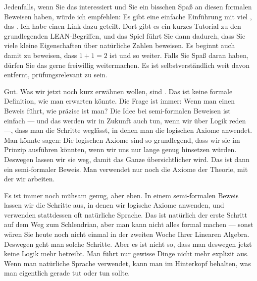\begin{spoken-clean}[00:17:30 - 00:20:50]
Jedenfalls, wenn Sie das interessiert und Sie ein bisschen Spaß an diesen formalen Beweisen haben, würde ich empfehlen: Es gibt eine einfache Einführung mit viel , das . Ich habe einen Link dazu geteilt. Dort gibt es ein kurzes Tutorial zu den grundlegenden LEAN-Begriffen, und das Spiel führt Sie dann dadurch, dass Sie viele kleine Eigenschaften über natürliche Zahlen beweisen. Es beginnt auch damit zu beweisen, dass $1 + 1 = 2$ ist und so weiter. Falls Sie Spaß daran haben, dürfen Sie das gerne freiwillig weitermachen. Es ist selbstverständlich weit davon entfernt, prüfungsrelevant zu sein.

Gut. Was wir jetzt noch kurz erwähnen wollen, sind . Das ist keine formale Definition, wie man erwarten könnte. Die Frage ist immer: Wenn man einen Beweis führt, wie präzise ist man? Die Idee bei semi-formalen Beweisen ist einfach --- und das werden wir in Zukunft auch tun, wenn wir über Logik reden ---, dass man die Schritte weglässt, in denen man die logischen Axiome anwendet. Man könnte sagen: Die logischen Axiome sind so grundlegend, dass wir sie im Prinzip ausführen könnten, wenn wir uns nur lange genug hinsetzen würden. Deswegen lassen wir sie weg, damit das Ganze übersichtlicher wird. Das ist dann ein semi-formaler Beweis. Man verwendet nur noch die Axiome der Theorie, mit der wir arbeiten.

Es ist immer noch mühsam genug, aber eben. In einem semi-formalen Beweis lassen wir die Schritte aus, in denen wir logische Axiome anwenden, und verwenden stattdessen oft natürliche Sprache. Das ist natürlich der erste Schritt auf dem Weg zum Schlendrian, aber man kann nicht alles formal machen --- sonst wären Sie heute noch nicht einmal in der zweiten Woche Ihrer Linearen Algebra. Deswegen geht man solche Schritte. Aber es ist nicht so, dass man deswegen jetzt keine Logik mehr betreibt. Man führt nur gewisse Dinge nicht mehr explizit aus. Wenn man natürliche Sprache verwendet, kann man im Hinterkopf behalten, was man eigentlich gerade tut oder tun sollte.\end{spoken-clean}

